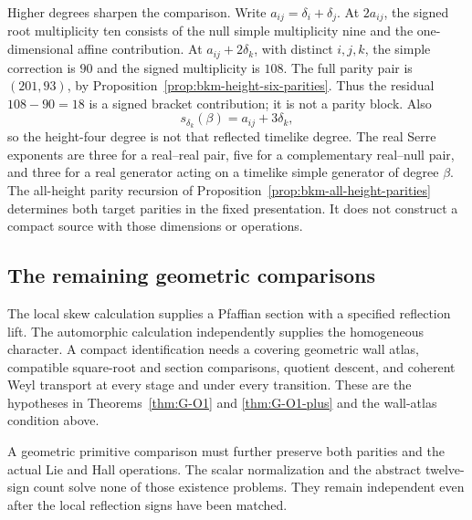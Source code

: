 Higher degrees sharpen the comparison. Write
\(a_{ij}=\delta_i+\delta_j\). At \(2a_{ij}\), the signed root
multiplicity ten consists of the null simple multiplicity nine and
the one-dimensional affine contribution. At
\(a_{ij}+2\delta_k\), with distinct \(i,j,k\), the simple
correction is \(90\) and the signed multiplicity is \(108\).
The full parity pair is \((201,93)\), by
Proposition~\ref{prop:bkm-height-six-parities}. Thus the residual
\(108-90=18\) is a signed bracket contribution; it is not a parity
block. Also
\[
 s_{\delta_k}(\beta)=a_{ij}+3\delta_k,
\]
so the height-four degree is not that reflected timelike degree.
The real Serre exponents are three for a real--real pair, five for a
complementary real--null pair, and three for a real generator acting
on a timelike simple generator of degree \(\beta\).
The all-height parity recursion of
Proposition~\ref{prop:bkm-all-height-parities} determines both target
parities in the fixed presentation. It does not construct a compact
source with those dimensions or operations.

\subsection{The remaining geometric comparisons}
\label{app:pfaffian-wall-open-obligations}

The local skew calculation supplies a Pfaffian section with a
specified reflection lift. The automorphic calculation independently
supplies the homogeneous character. A compact identification needs
a covering geometric wall atlas, compatible square-root and section
comparisons, quotient descent, and coherent Weyl transport at every
stage and under every transition. These are the hypotheses in
Theorems~\ref{thm:G-O1} and \ref{thm:G-O1-plus} and the wall-atlas
condition above.

A geometric primitive comparison must further preserve both
parities and the actual Lie and Hall operations. The scalar
normalization and the abstract twelve-sign count solve none of
those existence problems. They remain independent even after the
local reflection signs have been matched.
